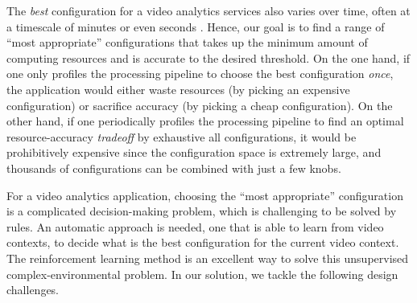 %

The \emph{best} configuration for a video analytics services also varies over time, often at a timescale of minutes or even seconds \cite{jiang2018chameleon}. Hence, our goal is to find a range of ``most appropriate'' configurations that takes up the minimum amount of computing resources and is accurate to the desired threshold. On the one hand, if one only profiles the processing pipeline to choose the best configuration \emph{once}, the application would either waste resources (by picking an expensive configuration) or sacrifice accuracy (by picking a cheap configuration). On the other hand, if one periodically profiles the processing pipeline to find an optimal resource-accuracy \emph{tradeoff} by exhaustive all configurations, it would be prohibitively expensive since the configuration space is extremely large, and thousands of configurations can be combined with just a few knobs.


For a video analytics application, choosing the ``most appropriate'' configuration is a complicated decision-making problem, which is challenging to be solved by rules. An automatic approach is needed, one that is able to learn from video contexts, to decide what is the best configuration for the current video context. The reinforcement learning method is an excellent way to solve this unsupervised complex-environmental problem. In our solution, we tackle the following design challenges.




